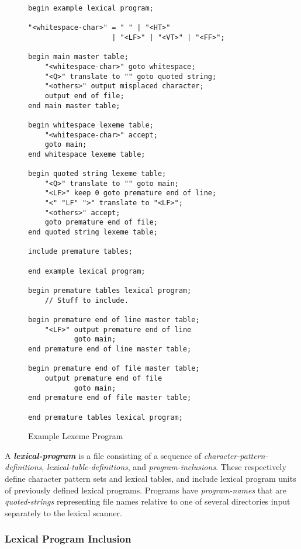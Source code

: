 \documentclass[12pt]{article}
\makeatletter
\newcommand{\emkey}[1]{{\bf \em #1}\index{#1@{\em #1}}}
\newcommand{\EOL}{\penalty \exhyphenpenalty}
\newlength{\figurewidth}
\newenvironment{boxedfigure}[1][!btp]%
	{\begin{figure*}[#1]
	 \begin{lrbox}{\figurebox}
	 \begin{minipage}{\figurewidth}

	 \vspace*{1ex}}%
	{
	 \vspace*{1ex}

	 \end{minipage}
	 \end{lrbox}

	 \centering
	 \fbox{\hspace*{0.1in}\usebox{\figurebox}\hspace*{0.1in}}
	 \end{figure*}}
\newenvironment{indpar}[1][0.3in]%
	{\begin{list}{}%
		     {\setlength{\itemsep}{0in}%
		      \setlength{\topsep}{0in}%
		      \setlength{\parsep}{1ex}%
		      \setlength{\labelwidth}{#1}%
		      \setlength{\leftmargin}{#1}%
		      \addtolength{\leftmargin}{\labelsep}}%
	 \item}%
	{\end{list}}
\makeatother
\begin{document}
\begin{boxedfigure}[!p]
\addtolength{\baselineskip}{-0.4ex}
\begin{indpar}\begin{verbatim}
begin example lexical program;

"<whitespace-char>" = " " | "<HT>"
                    | "<LF>" | "<VT>" | "<FF>";

begin main master table;
    "<whitespace-char>" goto whitespace;
    "<Q>" translate to "" goto quoted string;
    "<others>" output misplaced character;
    output end of file;
end main master table;

begin whitespace lexeme table;
    "<whitespace-char>" accept;
    goto main;
end whitespace lexeme table;

begin quoted string lexeme table;
    "<Q>" translate to "" goto main;
    "<LF>" keep 0 goto premature end of line;
    "<" "LF" ">" translate to "<LF>";
    "<others>" accept;
    goto premature end of file;
end quoted string lexeme table;

include premature tables;

end example lexical program;

begin premature tables lexical program;
    // Stuff to include.

begin premature end of line master table;
    "<LF>" output premature end of line
           goto main;
end premature end of line master table;

begin premature end of file master table;
    output premature end of file
           goto main;
end premature end of file master table;

end premature tables lexical program;
\end{verbatim}\end{indpar}
\caption{Example Lexeme Program}
\label{EXAMPLE-LEXEME-PROGRAM}
\end{boxedfigure}

A \emkey{lexical-program} is a file consisting of a sequence of
{\em character-\EOL pattern-\EOL defi\-ni\-tions},
{\em lexical-\EOL table-\EOL defi\-ni\-tions},
and {\em program-inclusions}.  These respectively define character pattern sets
and lexical tables, and include lexical program units of
previously defined lexical programs.
Programs have {\em program-names} that are {\em quoted-strings} representing
file names relative to one of several directories input separately to
the lexical scanner.

\subsubsection{Lexical Program Inclusion}
\end{document}
